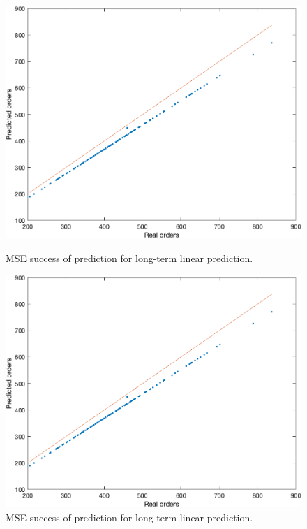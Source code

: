         \begin{figure}[!ht]
            \begin{minipage}{0.45\textwidth}
                \centering
                \includegraphics[width=1\textwidth]{figures/expCompLTLP.png}
                \caption{MSE success of prediction for long-term linear prediction.}
                \label{fig:eltlpres}
            \end{minipage}\hfill
            \begin{minipage}{0.45\textwidth}
                \centering
                \includegraphics[width=1\textwidth]{figures/expCompELTLP.png}
                \caption{MSE success of prediction for long-term linear prediction.}
                \label{fig:eltlpmse}
            \end{minipage}
        \end{figure}
